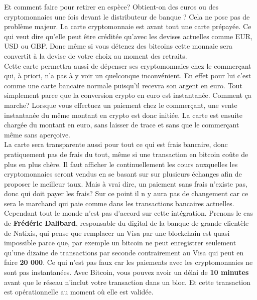\documentclass[12pt]{report}
\begin{document}
\hspace{1cm} Et comment faire pour retirer en espèce? Obtient-on des euros ou des cryptomonnaies une fois devant le distributeur de banque ? Cela ne pose pas de problème majeur. La carte cryptomonnaie est avant tout une carte prépayée. Ce qui veut dire qu'elle peut être créditée qu'avec les devises actuelles comme EUR, USD ou GBP. Donc même si vous détenez des bitcoins cette monnaie sera convertit à la devise de votre choix au moment des retraits.\\

\hspace{1cm} Cette carte permettra aussi de dépenser ses cryptomonnaies chez le commerçant qui, à priori, n'a pas à y voir un quelconque inconvénient. En effet pour lui c'est comme une carte bancaire normale puisqu'il recevra son argent en euro. Tout simplement parce que la conversion crypto en euro est instantanée. Comment ça marche? Lorsque vous effectuez un paiement chez le commerçant, une vente instantanée du même montant en crypto est donc initiée. La carte est ensuite chargée du montant en euro, sans laisser de trace et sans que le commerçant même sans aperçoive.\\

\hspace{1cm} La carte sera transparente aussi pour tout ce qui est frais bancaire, donc pratiquement pas de frais du tout, même si une transaction en bitcoin coûte de plus en plus chère. Il faut afficher le continuellement les cours auxquelles les cryptomonnaies seront vendus en se basant sur sur plusieurs échanges afin de proposer le meilleur taux. Mais à vrai dire, un paiement sans frais n'existe pas, donc qui doit payer les frais? Sur ce point il n y aura pas de changement car ce sera le marchand qui paie comme dans les transactions bancaires actuelles.\\

\hspace{1cm} Cependant tout le monde n'est pas d'accord sur cette intégration. Prenons le cas de \textbf{Frédéric Dalibard}, responsable du digital de la banque de grande clientèle de Natixis, qui pense que remplacer un Visa par une blockchain est quasi impossible parce que, par exemple un bitcoin ne peut enregistrer seulement qu'une dizaine de transactions par seconde contrairement au Visa qui peut en faire \textbf{20 000}. Ce qui n'est pas faux car les paiements avec les cryptomonnaies ne sont pas instantanées. Avec Bitcoin, vous pouvez avoir un délai de \textbf{10 minutes} avant que le réseau n'inclut votre transaction dans un bloc. Et cette transaction est opérationnelle au moment où elle est validée.\\
\end{document}
